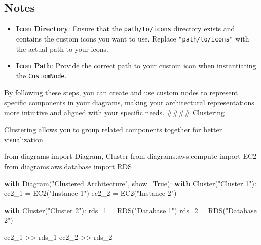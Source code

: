 \documentclass[
  letterpaper,
  DIV=11,
  numbers=noendperiod]{scrreprt}
\newenvironment{Shaded}{\begin{snugshade}}{\end{snugshade}}
\newcommand{\ControlFlowTok}[1]{\textcolor[rgb]{0.00,0.23,0.31}{\textbf{#1}}}
\newcommand{\ImportTok}[1]{\textcolor[rgb]{0.00,0.46,0.62}{#1}}
\newcommand{\NormalTok}[1]{\textcolor[rgb]{0.00,0.23,0.31}{#1}}
\newcommand{\OperatorTok}[1]{\textcolor[rgb]{0.37,0.37,0.37}{#1}}
\newcommand{\StringTok}[1]{\textcolor[rgb]{0.13,0.47,0.30}{#1}}
\newcommand{\VariableTok}[1]{\textcolor[rgb]{0.07,0.07,0.07}{#1}}
\providecommand{\tightlist}{%
  \setlength{\itemsep}{0pt}\setlength{\parskip}{0pt}}\usepackage{longtable,booktabs,array}
\begin{document}
\subsection{Notes}\label{notes}

\begin{itemize}
\tightlist
\item
  \textbf{Icon Directory}: Ensure that the \texttt{path/to/icons}
  directory exists and contains the custom icons you want to use.
  Replace \texttt{"path/to/icons"} with the actual path to your icons.
\item
  \textbf{Icon Path}: Provide the correct path to your custom icon when
  instantiating the \texttt{CustomNode}.
\end{itemize}

By following these steps, you can create and use custom nodes to
represent specific components in your diagrams, making your
architectural representations more intuitive and aligned with your
specific needs. \#\#\#\# Clustering

Clustering allows you to group related components together for better
visualization.

\begin{Shaded}
\begin{Highlighting}[]
\ImportTok{from}\NormalTok{ diagrams }\ImportTok{import}\NormalTok{ Diagram, Cluster}
\ImportTok{from}\NormalTok{ diagrams.aws.compute }\ImportTok{import}\NormalTok{ EC2}
\ImportTok{from}\NormalTok{ diagrams.aws.database }\ImportTok{import}\NormalTok{ RDS}

\ControlFlowTok{with}\NormalTok{ Diagram(}\StringTok{"Clustered Architecture"}\NormalTok{, show}\OperatorTok{=}\VariableTok{True}\NormalTok{):}
    \ControlFlowTok{with}\NormalTok{ Cluster(}\StringTok{"Cluster 1"}\NormalTok{):}
\NormalTok{        ec2\_1 }\OperatorTok{=}\NormalTok{ EC2(}\StringTok{"Instance 1"}\NormalTok{)}
\NormalTok{        ec2\_2 }\OperatorTok{=}\NormalTok{ EC2(}\StringTok{"Instance 2"}\NormalTok{)}
    
    \ControlFlowTok{with}\NormalTok{ Cluster(}\StringTok{"Cluster 2"}\NormalTok{):}
\NormalTok{        rds\_1 }\OperatorTok{=}\NormalTok{ RDS(}\StringTok{"Database 1"}\NormalTok{)}
\NormalTok{        rds\_2 }\OperatorTok{=}\NormalTok{ RDS(}\StringTok{"Database 2"}\NormalTok{)}
    
\NormalTok{    ec2\_1 }\OperatorTok{\textgreater{}\textgreater{}}\NormalTok{ rds\_1}
\NormalTok{    ec2\_2 }\OperatorTok{\textgreater{}\textgreater{}}\NormalTok{ rds\_2}
\end{Highlighting}
\end{Shaded}
\end{document}
